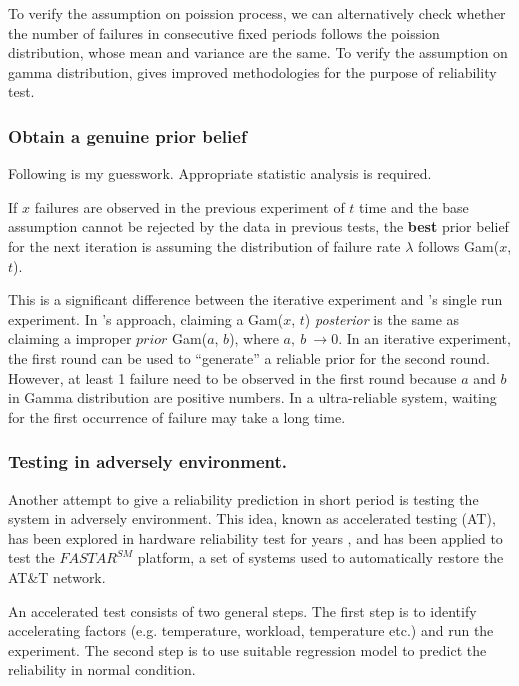 \documentclass[12pt, authoryear]{article}
\begin{document}
To verify the assumption on poission process, we can alternatively check 
whether the number of failures in consecutive fixed periods follows the 
poission distribution, whose mean and variance are the same.  To verify the 
assumption on gamma distribution, \citep{GammaFIT} gives improved methodologies 
for the purpose of reliability test.


\subsubsection{Obtain a genuine prior belief}

Following is my guesswork. Appropriate statistic analysis is required.

If $x$ failures are observed in the previous experiment of $t$ time and the 
base assumption cannot be rejected by the data in previous tests, the 
{\bf best} prior belief for the next iteration is assuming the distribution of 
failure rate $\lambda$ follows Gam($x$, $t$).

This is a significant difference between the iterative experiment and 
\citeauthor{Littlewood93}'s single run experiment.  In 
\citeauthor{Littlewood93}'s approach, claiming a Gam($x$, $t$) {\it posterior} 
is the same as claiming a improper $prior$ Gam($a$, $b$), where $a,\ b\ 
\rightarrow 0$.  In an iterative experiment, the first round can be used to 
``generate'' a reliable prior for the second round.  However, at least 1 failure 
need to be observed in the first round because $a$ and $b$ in Gamma distribution 
are positive numbers.  In a ultra-reliable system, waiting for the first 
occurrence of failure may take a long time.


\subsubsection{Testing in adversely environment.}

Another attempt to give a reliability prediction in short period is testing 
the system in adversely environment.  This idea, known as accelerated testing 
(AT), has been explored in hardware reliability test for years 
\citep{Escobar06areview}, and has been applied to test the $FASTAR^{SM}$ 
platform, a set of systems used to automatically  restore the AT\&T 
network\citep{CukicSoft}.

An accelerated test consists of two general steps.  The first step is to 
identify accelerating factors (e.g. temperature, workload, temperature etc.) and 
run the experiment.  The second step is to use suitable regression model to 
predict the reliability in normal condition.  
\end{document}
